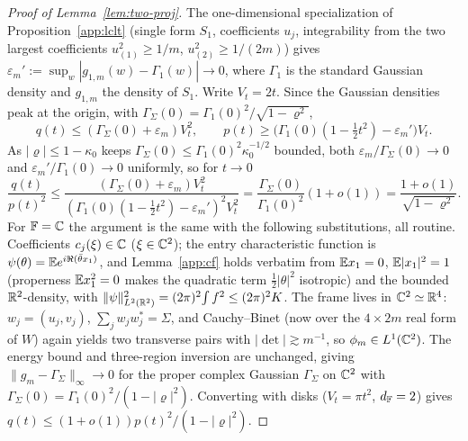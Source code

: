 \begin{proof}[Proof of Lemma~\ref{lem:two-proj}]
The one-dimensional specialization of Proposition~\ref{app:lclt} (single form $S_1$, coefficients
$u_j$, integrability from the two largest coefficients $u_{(1)}^2\ge1/m$, $u_{(2)}^2\ge1/(2m)$)
gives $\varepsilon_m':=\sup_w|g_{1,m}(w)-\Gamma_1(w)|\to0$, where $\Gamma_1$ is the standard
Gaussian density and $g_{1,m}$ the density of $S_1$.  Write $V_t=2t$.  Since the Gaussian densities
peak at the origin, with $\Gamma_\Sigma(0)=\Gamma_1(0)^2/\sqrt{1-\varrho^2}$,
\[
  q(t)\le(\Gamma_\Sigma(0)+\varepsilon_m)V_t^2,\qquad
  p(t)\ge\bigl(\Gamma_1(0)(1-\tfrac12t^2)-\varepsilon_m'\bigr)V_t .
\]
As $|\varrho|\le1-\kappa_0$ keeps $\Gamma_\Sigma(0)\le\Gamma_1(0)^2\kappa_0^{-1/2}$ bounded, both
$\varepsilon_m/\Gamma_\Sigma(0)\to0$ and $\varepsilon_m'/\Gamma_1(0)\to0$ uniformly, so for $t\to0$
\[
  \frac{q(t)}{p(t)^2}\le\frac{(\Gamma_\Sigma(0)+\varepsilon_m)V_t^2}
       {(\Gamma_1(0)(1-\tfrac12t^2)-\varepsilon_m')^2V_t^2}
  =\frac{\Gamma_\Sigma(0)}{\Gamma_1(0)^2}(1+o(1))=\frac{1+o(1)}{\sqrt{1-\varrho^2}} .
\]
For $\mathbb{F}=\mathbb{C}$ the argument is the same with the following substitutions, all routine.
Coefficients $c_j(\xi)\in\mathbb{C}$ ($\xi\in\mathbb{C}^2$); the entry characteristic function is
$\psi(\theta)=\mathbb{E} e^{i\Re(\bar\theta x_1)}$, and Lemma~\ref{app:cf} holds verbatim from
$\mathbb{E} x_1=0$, $\mathbb{E}|x_1|^2=1$ (properness $\mathbb{E} x_1^2=0$ makes the quadratic term
$\tfrac12|\theta|^2$ isotropic) and the bounded $\mathbb{R}^2$-density, with
$\|\psi\|_{L^2(\mathbb{R}^2)}^2=(2\pi)^2\!\int f^2\le(2\pi)^2K$.  The frame lives in $\mathbb{C}^2\simeq\mathbb{R}^4$:
$w_j=(u_j,v_j)$, $\sum_j w_jw_j^{*}=\Sigma$, and Cauchy--Binet (now over the $4\times2m$ real form
of $W$) again yields two transverse pairs with $|\det|\gtrsim m^{-1}$, so $\phi_m\in L^1(\mathbb{C}^2)$.
The energy bound and three-region inversion are unchanged, giving
$\|g_m-\Gamma_\Sigma\|_\infty\to0$ for the proper complex Gaussian $\Gamma_\Sigma$ on $\mathbb{C}^2$ with
$\Gamma_\Sigma(0)=\Gamma_1(0)^2/(1-|\varrho|^2)$.  Converting with disks ($V_t=\pi t^2$,
$d_{\mathbb{F}}=2$) gives $q(t)\le(1+o(1))p(t)^2/(1-|\varrho|^2)$.
\end{proof}
